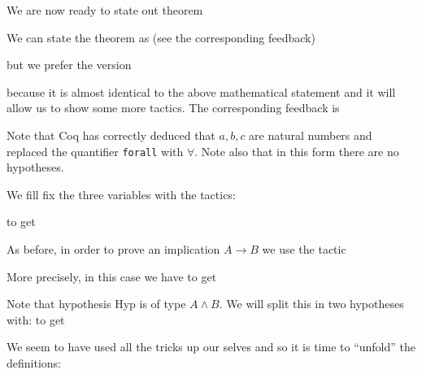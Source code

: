 We are now ready to state out theorem

We can state the theorem as (see the corresponding feedback)



but we prefer the version

because it is  almost identical to the above mathematical statement and it will allow us to show some more tactics. The corresponding feedback is

Note that Coq has correctly deduced that $a, b, c$ are natural numbers and replaced the quantifier \texttt{forall} with $\forall$. Note also that in this form there are no hypotheses.

We fill fix the three variables with the tactics:

to get 

As before, in order to prove an implication $A\rightarrow B$ we use the tactic


More precisely, in this case we have
to get



Note that hypothesis Hyp is of type $A \land B$. We will split this in two hypotheses with:
to get


We seem to have used all the tricks up our selves and so it is time to ``unfold'' the definitions:

